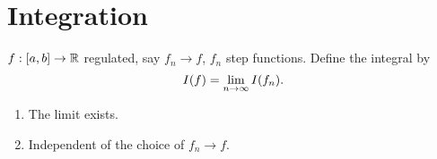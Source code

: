 \chapter{Integration}\label{cha:integration}

\begin{definition}\label{def:reg_int}
    $f : [a, b] \to \mathbb{R}$ regulated,
    say $f_n \to f$,
    $f_n$ step functions.
    Define the integral by
    \[
    I(f) = \lim_{n \rightarrow \infty} I(f_n).
    \]
\end{definition}

\begin{proposition}\label{prop:exists_reg_int}
   \begin{enumerate}[label = (\alph*)]
    \item The limit exists.

    \item Independent of the choice of $f_n \to f$.
    \end{enumerate}
\end{proposition}
